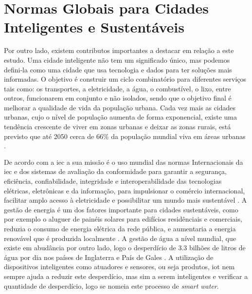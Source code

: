 \section{Normas Globais para Cidades Inteligentes e Sustentáveis}
\label{sec:normas_globais_cidades_inteligentes_sustentaveis}
Por outro lado, existem contributos importantes a destacar em relação a este estudo.
Uma cidade inteligente não tem um significado único, mas podemos defini-la como uma cidade que usa tecnologia e dados para ter soluções mais informadas. O objetivo é construir um ciclo combinatório para diferentes serviços tais como: os transportes, a eletricidade, a água, o combustível, o lixo,  entre outros, funcionarem em conjunto e não isolados, sendo que o objetivo final é melhorar a qualidade de vida da população urbana.
Cada vez mais as cidades urbanas, cujo o nível de população aumenta de forma exponencial, existe uma tendência crescente de viver em zonas urbanas e deixar as zonas rurais, está previsto que até 2050 cerca de 66\% da população mundial viva em áreas urbanas \cite{article}.

De acordo  com a \gls{iec} a sua missão é o uso mundial das normas Internacionais da \gls{iec} e dos sistemas de avaliação da conformidade para garantir a segurança, eficiência, confiabilidade, integridade e  interoperabilidade das tecnologias elétricas, eletrônicas e da informação, para impulsionar o comércio internacional, facilitar amplo acesso à eletricidade e possibilitar um mundo mais sustentável \cite{IEC}.
A gestão de energia é um dos fatores importante para cidades sustentáveis, como por exemplo o aluguer de painéis solares para edifícios residênciais e comerciais, reduzia o consumo de energia elétrica da rede pública, e aumentaria a energia renovável que é produzida localmente \cite{EnergiaSolar}.
A gestão de água a nível mundial, que existe em abudância por outro lado, logo o desperdício de 3.3 bilhões de litros de água por dia nos países de Inglaterra e País de Gales \cite{article}.
A utilização de dispositivos inteligentes como atuadores e sensores, ou seja produtos, \gls{iot} nem sempre ajuda a reduzir este desperdício, mas sim a serem inteligentes e verificar a quantidade de desperdício, logo se nomeia este processo de \textit{smart water}\cite{article}.

